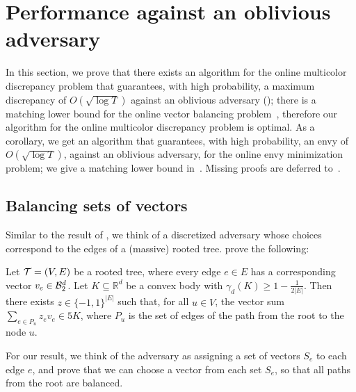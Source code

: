 \section{Performance against an oblivious adversary}\label{sec: oblivious}
 
In this section, we prove that there exists an algorithm for the online multicolor discrepancy problem that guarantees, with high probability, a maximum discrepancy of $O(\sqrt{\log T})$ against an oblivious adversary (); there is a matching lower bound for the online vector balancing problem~\cite{kulkarni2024optimal}, therefore our algorithm for the online multicolor discrepancy problem is optimal. As a corollary, we get an algorithm that guarantees, with high probability, an envy of $O(\sqrt{\log T})$, against an oblivious adversary, for the online envy minimization problem; we give a matching lower bound in~. Missing proofs are deferred to~.

\subsection{Balancing sets of vectors}\label{subsec: balance sets of vectors}



Similar to the result of \citet{kulkarni2024optimal}, we think of a discretized adversary whose choices correspond to the edges of a (massive) rooted tree. \citeauthor{kulkarni2024optimal} prove the following:


\begin{theorem}\label{theorem:tree-kulkarni} Let $\mathcal{T} = (V,E)$ be a rooted tree, where every edge $e \in E$ has a corresponding vector $v_e \in \mathcal{B}^d_2$. Let $K \subseteq \mathbb{R}^d$ be a convex body with $\gamma_d(K) \geq 1 - \frac{1}{2|E|}$. Then there exists $z \in \{-1,1\}^{|E|}$ such that, for all $u \in V$, the vector sum $\sum_{e \in P_u} z_e v_e \in 5K$, where $P_u$ is the set of edges of the path from the root to the node $u$.
\end{theorem}

For our result, we think of the adversary as assigning a set of vectors $S_e$ to each edge $e$, and prove that we can choose a vector from each set $S_e$, so that all paths from the root are balanced.


